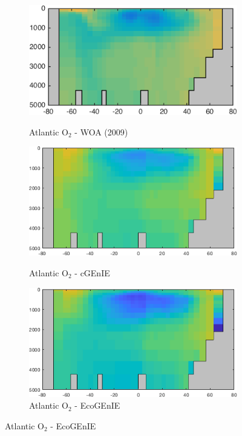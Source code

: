 \documentclass{article}
\begin{document}
\begin{figure}[htp]
 \centering
\begin{subfigure}{.33\textwidth}
 \caption{Atlantic O$_2$ - WOA (2009)}
 \includegraphics[width=0.95\linewidth]{../Separate_figures/OBSERVATIONS/Atlantic_o_an_profile.png}
 \label{fig:nutrients1}
\end{subfigure}%
\begin{subfigure}{.33\textwidth}
 \caption{Atlantic O$_2$ - cGEnIE}
 \includegraphics[width=0.95\linewidth]{../Separate_figures/BIOGEM/Atlantic_ocn_O2_profile.png}
 \label{fig:nutrients1}
\end{subfigure}%
\begin{subfigure}{.33\textwidth}
 \caption{Atlantic O$_2$ - EcoGEnIE}
 \includegraphics[width=0.95\linewidth]{../Separate_figures/ECOGEM/Atlantic_ocn_O2_profile.png}

\end{subfigure}
\end{figure}
\end{document}
